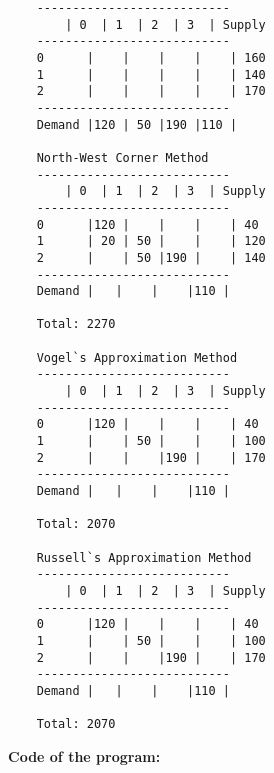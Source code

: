 \documentclass[12pt, legalpaper]{exam}
\begin{document}
\begin{verbatim}
    ---------------------------
        | 0  | 1  | 2  | 3  | Supply
    ---------------------------
    0      |    |    |    |    | 160
    1      |    |    |    |    | 140
    2      |    |    |    |    | 170
    ---------------------------
    Demand |120 | 50 |190 |110 |

    North-West Corner Method
    ---------------------------
        | 0  | 1  | 2  | 3  | Supply
    ---------------------------
    0      |120 |    |    |    | 40
    1      | 20 | 50 |    |    | 120
    2      |    | 50 |190 |    | 140
    ---------------------------
    Demand |   |    |    |110 |

    Total: 2270

    Vogel`s Approximation Method
    ---------------------------
        | 0  | 1  | 2  | 3  | Supply
    ---------------------------
    0      |120 |    |    |    | 40
    1      |    | 50 |    |    | 100
    2      |    |    |190 |    | 170
    ---------------------------
    Demand |   |    |    |110 |

    Total: 2070

    Russell`s Approximation Method
    ---------------------------
        | 0  | 1  | 2  | 3  | Supply
    ---------------------------
    0      |120 |    |    |    | 40
    1      |    | 50 |    |    | 100
    2      |    |    |190 |    | 170
    ---------------------------
    Demand |   |    |    |110 |

    Total: 2070
\end{verbatim}

\noindent
{}




\clearpage
\noindent     \textbf{Code of the program:}
\end{document}
